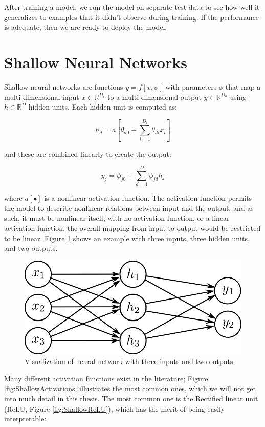 \noindent After training a model, we run the model on separate test data to see how well it generalizes to examples that it didn't observe during training. If the performance is adequate, then we are ready to deploy the model.

\section{Shallow Neural Networks}
Shallow neural networks are functions $y = f[x, \phi]$ with parameters $\phi$ that map a multi-dimensional input $x \in \mathbb{R}^{D_{i}}$ to a multi-dimensional output $y \in \mathbb{R}^{D_{o}}$ using $h \in \mathbb{R}^{D}$ hidden units. Each hidden unit is computed as:

\begin{equation}
    h_{d}=a\left[\theta_{d0}+\sum_{i=1}^{D_{i}} \theta_{d i} x_{i}\right]
\end{equation}

\noindent and these are combined linearly to create the output:

\begin{equation}
    y_{j}=\phi_{j0}+\sum_{d=1}^{D} \phi_{j d} h_{j}
\end{equation}

\noindent where $a[\bullet]$ is a nonlinear activation function. The activation function permits the model to describe nonlinear relations between input and the output, and as such, it must be nonlinear itself; with no activation function, or a linear activation function, the overall mapping from input to output would be restricted to be linear. Figure \ref{fig:ShallowNet} shows an example with three inputs, three hidden units, and two outputs. \\

\begin{figure}[H]
    \centering
    \includegraphics[width=0.6\linewidth]{Images/ShallowNetThreeInputsTwoOutputs.jpg}
    \caption{Visualization of neural network with three inputs and two outputs.}
    \label{fig:ShallowNet}
\end{figure}

\noindent Many different activation functions exist in the literature; Figure \ref{fig:ShallowActivations} illustrates the most common ones, which we will not get into much detail in this thesis. The most common one is the Rectified linear unit (ReLU, Figure \ref{fig:ShallowReLU}), which has the merit of being easily interpretable:

